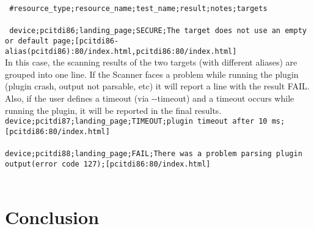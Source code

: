 \texttt{
\#resource\_type;resource\_name;test\_name;result;notes;targets}
\\
\\
\texttt{
device;pcitdi86;landing\_page;SECURE;The target does not use an empty or default page;[pcitdi86-alias(pcitdi86):80/index.html,pcitdi86:80/index.html]
}
\\
In this case, the scanning results of the two targets (with different aliases) are grouped into one line.
If the Scanner faces a problem while running the plugin (plugin crash, output not parsable, etc) it will report a line with the result FAIL. Also, if the user defines a timeout (via -{}-timeout) and a timeout occurs while running the plugin, it will be reported in the final results.
\\ 
\texttt{device;pcitdi87;landing\_page;TIMEOUT;plugin timeout after 10 ms;[pcitdi86:80/index.html]}
\\
\\
\texttt{device;pcitdi88;landing\_page;FAIL;There was a problem parsing plugin output(error code 127);[pcitdi86:80/index.html]}
\\
\\
%
%
%    
%

\section{Conclusion}
